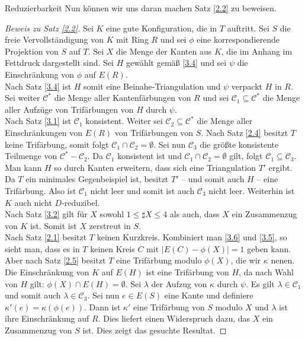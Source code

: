 \begin{section}{Reduzierbarkeit}
 Nun können wir uns daran machen Satz \ref{2.2} zu beweisen.
 \begin{proof}[Beweis zu Satz \ref{2.2}]
  Sei $K$ eine gute Konfiguration, die in $T$ auftritt. Sei $S$ die freie Vervollständigung von $K$ mit Ring $R$ und sei $\phi$ eine korrespondierende Projektion von $S$ auf $T$. Sei $X$ die Menge der Kanten aus $K$, die im Anhang im Fettdruck dargestellt sind. Sei $H$ gewählt gemäß \ref{3.4} und sei $\psi$ die Einschränkung von $\phi$ auf $E(R)$.\\
  Nach Satz \ref{3.4} ist $H$ somit eine Beinahe-Triangulation und $\psi$ verpackt $H$ in $R$. Sei weiter $\mathscr{C}^*$ die Menge aller Kantenfärbungen von $R$ und sei $\mathscr{C}_1 \subseteq \mathscr{C}^*$ die Menge aller Aufzüge von Trifärbungen von $H$ durch $\psi$.\\
  Nach Satz \ref{3.1} ist $\mathscr{C}_1$ konsistent. Weiter sei $\mathscr{C}_2 \subseteq \mathscr{C}^*$ die Menge aller Einschränkungen von $E(R)$ von Trifärbungen von $S$. Nach Satz \ref{2.4} besitzt $T$ keine Trifärbung, somit folgt $\mathscr{C}_1 \cap \mathscr{C}_2 = \emptyset$. Sei nun $\mathscr{C}_3$ die größte konsistente Teilmenge von $\mathscr{C}^* - \mathscr{C}_2$. Da $\mathscr{C}_1$ konsistent ist und $\mathscr{C}_1 \cap \mathscr{C}_2 = \emptyset$ gilt, folgt $\mathscr{C}_1 \subseteq \mathscr{C}_3$.\\
  Man kann $H$ so durch Kanten erweitern, dass sich eine Triangulation $T'$ ergibt. Da $T$ ein minimales Gegenbeispiel ist, besitzt $T'$ -- und somit auch $H$ -- eine Trifärbung. Also ist $\mathscr{C}_1$ nicht leer und somit ist auch $\mathscr{C}_3$ nicht leer. Weiterhin ist $K$ auch nicht $D$-reduzibel.\\
  Nach Satz \ref{3.2} gilt für $X$ sowohl $1 \leq \sharp X \leq 4$ als auch, dass $X$ ein Zusammenzug von $K$ ist. Somit ist $X$ zerstreut in $S$. \\
  Nach Satz \ref{2.1} besitzt $T$ keinen Kurzkreis. Kombiniert man \ref{3.6} und \ref{3.5}, so sieht man, dass es in $T$ keinen Kreis $C$ mit $|E(C) - \phi(X)| = 1$ geben kann. Aber nach Satz \ref{2.5} besitzt $T$ eine Trifärbung modulo $\phi(X)$, die wir $\kappa$ nenen. Die Einschränkung von $K$ auf $E(H)$ ist eine Trifärbung von $H$, da nach Wahl von $H$ gilt: $\phi(X) \cap E(H) = \emptyset$. Sei $\lambda$ der Aufzug von $\kappa$ durch $\psi$. Es gilt $\lambda \in \mathscr{C}_1$ und somit auch  $\lambda \in \mathscr{C}_3$. Sei nun $e \in E(S)$ eine Kante und definiere $\kappa'(e) = \kappa(\phi(e))$. Dann ist $\kappa'$ eine Trifärbung von $S$ modulo $X$ und $\lambda$ ist ihre Einschränkung auf $R$. Dies liefert einen Widerspruch dazu, das $X$ ein Zusammenzug von $S$ ist. Dies zeigt das gesuchte Resultat.
 \end{proof}
\end{section}